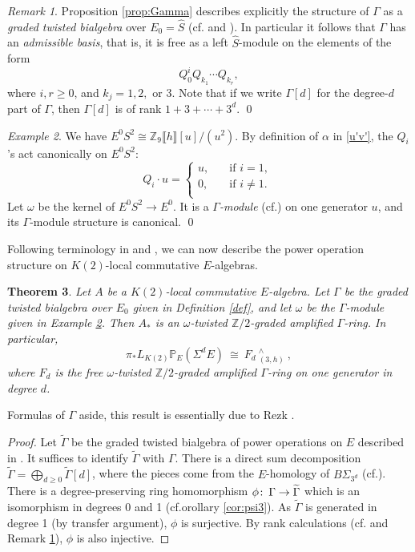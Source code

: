 \documentclass{gtpart}
\newtheorem{thm}{Theorem}
\theoremstyle{definition}
\theoremstyle{remark}
\newtheorem{rmk}[thm]{Remark}
\newtheorem{exam}[thm]{Example}
\def\co{\colon\thinspace}
\newcommand{\mb}[1]{\mathbb{#1}}
\newcommand{\cff}[2]{cf.\thinspace{\cite[#1]{#2}}}
\newcommand{\BP}{{\mb P}}
\newcommand{\BZ}{{\mb Z}}
\newcommand{\HS}{\widehat{S}}
\newcommand{\TG}{\widetilde{\G}}
\newcommand{\A}{\alpha}
\newcommand{\G}{\Gamma}
\begin{document}
\begin{rmk}
\label{rmk:rank}
 Proposition \ref{prop:Gamma} describes explicitly the structure of $\G$ as a {\em graded twisted bialgebra} over $E_0 = \HS$ (\cff{Section 5}{cong} and \cite[2.1]{h2p2}).  
 In particular it follows that $\G$ has an {\em admissible basis}, that is, it is free as a left $\HS$-module on the elements of the form 
 \[
  Q_0^i Q_{k_1} \cdots Q_{k_r}, 
 \]
 where $i, r \geq 0$, and $k_j = 1, 2,$ or 3.  
 Note that if we write $\G[d]$ for the degree-$d$ part of $\G$, then $\G[d]$ is of rank $1 + 3 + \cdots + 3^d$.  
\qed
\end{rmk}

\begin{exam}
\label{ex:omega}
 We have $E^0 S^2 \cong \BZ_9 \llbracket h \rrbracket [u] / (u^2)$.  
 By definition of $\A$ in \eqref{u'v'}, the $Q_i$'s act canonically on $E^0 S^2$: 
 \[
  Q_i \cdot u = \left\{
  \begin{array}{ll}
    u,  & \quad \text{if $i = 1$, }\\
    0,  & \quad \text{if $i \neq 1$.  }\\
  \end{array}
  \right.
 \]
 Let $\omega$ be the kernel of $E^0 S^2 \to E^0$.  It is a {\em $\G$-module} (\cff{2.2}{h2p2}) on one generator $u$, and its $\G$-module structure is canonical.  
\qed
\end{exam}

Following terminology in \cite[Section 2]{cong} and \cite[2.5 and 2.6]{h2p2}, we can now describe the power operation structure on $K(2)$-local commutative $E$-algebras.  
\begin{thm}
\label{thm}
 Let $A$ be a $K(2)$-local commutative $E$-algebra.  
 Let $\G$ be the graded twisted bialgebra over $E_0$ given in Definition \ref{def}, and let $\omega$ be the $\G$-module given in Example \ref{ex:omega}.  
 Then $A_*$ is an {\em $\omega$-twisted $\BZ/2$-graded amplified $\G$-ring}.  In particular, 
 \[
  \pi_* L_{K(2)} \BP_E (\Sigma^d E) ~ \cong ~ {F_d}~_{(3,h)}^{\wedge} ~ , 
 \]
 where $F_d$ is the free $\omega$-twisted $\BZ/2$-graded amplified $\G$-ring on one generator in degree $d$.  
\end{thm}
Formulas of $\G$ aside, this result is essentially due to Rezk \cite{cong, h2p2}.  
\begin{proof}
 Let $\TG$ be the graded twisted bialgebra of power operations on $E$ described in \cite[Section 6]{cong}.  
 It suffices to identify $\TG$ with $\G$.  
 There is a direct sum decomposition $\TG = \bigoplus_{d \geq 0} \TG[d]$, where the pieces come from the $E$-homology of $B\Sigma_{3^d}$ (\cff{6.2}{cong}).  
 There is a degree-preserving ring homomorphism $\phi \co \G \to \TG$ which is an isomorphism in degrees 0 and 1 (cf.orollary \ref{cor:psi3}).  
 As $\TG$ is generated in degree 1 (by transfer argument), $\phi$ is surjective.  
 By rank calculations (\cff{Section 6}{ST} and Remark \ref{rmk:rank}), $\phi$ is also injective.  
\end{proof}
\end{document}
